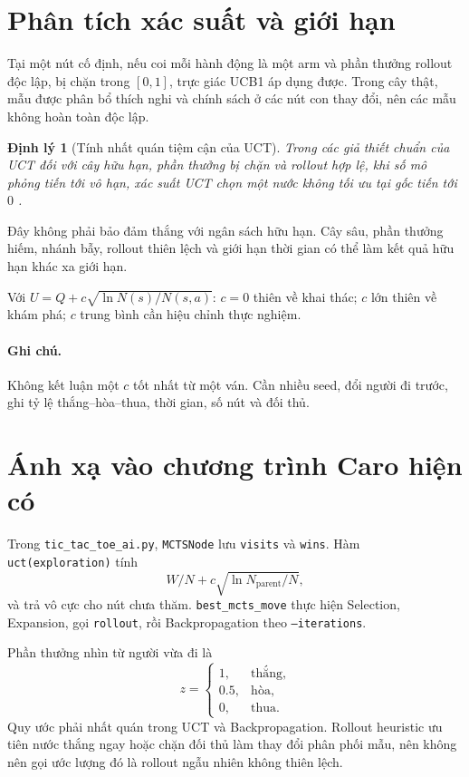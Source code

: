 \documentclass[conference]{IEEEtran}
\newtheorem{theorem}[definition]{Định lý}
\begin{document}
\section{Phân tích xác suất và giới hạn}
Tại một nút cố định, nếu coi mỗi hành động là một arm và phần thưởng rollout độc
lập, bị chặn trong $[0,1]$, trực giác UCB1 áp dụng được. Trong cây thật, mẫu được
phân bổ thích nghi và chính sách ở các nút con thay đổi, nên các mẫu không hoàn
toàn độc lập.

\begin{theorem}[Tính nhất quán tiệm cận của UCT]
Trong các giả thiết chuẩn của UCT đối với cây hữu hạn, phần thưởng bị chặn và
rollout hợp lệ, khi số mô phỏng tiến tới vô hạn, xác suất UCT chọn một nước không
tối ưu tại gốc tiến tới $0$ \cite{kocsis2006}.
\end{theorem}

Đây không phải bảo đảm thắng với ngân sách hữu hạn. Cây sâu, phần thưởng hiếm,
nhánh bẫy, rollout thiên lệch và giới hạn thời gian có thể làm kết quả hữu hạn
khác xa giới hạn.

Với $U=Q+c\sqrt{\ln N(s)/N(s,a)}$: $c=0$ thiên về khai thác; $c$ lớn thiên về
khám phá; $c$ trung bình cần hiệu chỉnh thực nghiệm.

\paragraph{Ghi chú.} Không kết luận một $c$ tốt nhất từ một ván. Cần nhiều seed,
đổi người đi trước, ghi tỷ lệ thắng--hòa--thua, thời gian, số nút và đối thủ.

\section{Ánh xạ vào chương trình Caro hiện có}
Trong \texttt{tic\_tac\_toe\_ai.py}, \texttt{MCTSNode} lưu \texttt{visits} và
\texttt{wins}. Hàm \texttt{uct(exploration)} tính
\[
W/N+c\sqrt{\ln N_{\mathrm{parent}}/N},
\]
và trả vô cực cho nút chưa thăm. \texttt{best\_mcts\_move} thực hiện Selection,
Expansion, gọi \texttt{rollout}, rồi Backpropagation theo \texttt{--iterations}.

Phần thưởng nhìn từ người vừa đi là
\[
z=\begin{cases}1,&\text{thắng},\\0.5,&\text{hòa},\\0,&\text{thua}.
\end{cases}
\]
Quy ước phải nhất quán trong UCT và Backpropagation. Rollout heuristic ưu tiên
nước thắng ngay hoặc chặn đối thủ làm thay đổi phân phối mẫu, nên không nên gọi
ước lượng đó là rollout ngẫu nhiên không thiên lệch.
\end{document}
